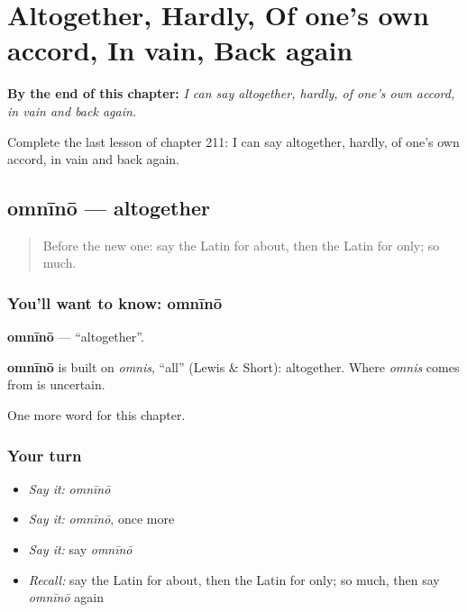 
\chapter{Altogether, Hardly, Of one's own accord, In vain, Back again}
\label{ch:la-altogether-hardly-of-one-s-own-accord-in-vain-back-again}

\begin{chapteropening}
\textbf{By the end of this chapter:} \emph{I can say altogether, hardly, of one's own accord, in vain and back again.}

Complete the last lesson of chapter 211: I can say altogether, hardly, of one's own accord, in vain and back again.
\end{chapteropening}

\section[omnīnō]{omnīnō — altogether}

\label{lesson:LA-C211-omnino}



\begin{quote}
Before the new one: say the Latin for about, then the Latin for only; so much.
\end{quote}

\subsection*{You'll want to know: omnīnō}
\textbf{omnīnō} — \textquotedblleft{}altogether\textquotedblright{}.

\begin{cousinweb}
\textbf{omnīnō} is built on \emph{omnis}, \textquotedblleft{}all\textquotedblright{} (Lewis \& Short): altogether. Where \emph{omnis} comes from is uncertain.
\end{cousinweb}

\begin{grammarlens}[title={What you've built}]
One more word for this chapter.
\end{grammarlens}

\subsection*{Your turn}
\begin{itemize}
\raggedright
  \item \emph{Say it:} \emph{omnīnō}
  \item \emph{Say it:} \emph{omnīnō}, once more
  \item \emph{Say it:} say \emph{omnīnō}
  \item \emph{Recall:} say the Latin for about, then the Latin for only; so much, then say \emph{omnīnō} again
\end{itemize}

